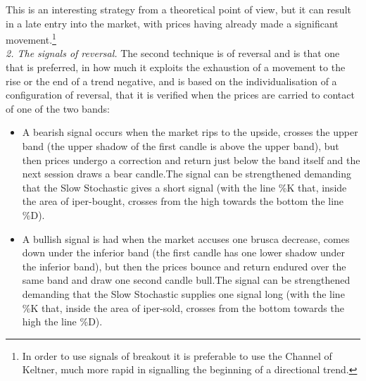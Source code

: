 This is an interesting strategy from a theoretical point of view, but it can result in a late entry into the market, with prices having already made a significant movement.\footnote{In order to use signals of breakout it is preferable to use the Channel of Keltner, much more rapid in signalling the beginning of a directional trend.}  \\

\noindent\textit{2. The signals of reversal.} The second technique is of reversal and is that one that is preferred, in how much it exploits the exhaustion of a movement to the rise or the end of a trend negative, and is based on the individualisation of a configuration of reversal, that it is verified when the prices are carried to contact of one of the two bands: 

\begin{itemize}
\setlength\itemsep{0.3em}
\item A bearish signal occurs when the market rips to the upside, crosses the upper band (the upper shadow of the first candle is above the upper band), but then prices undergo a correction and return just below the band itself and the next session draws a bear candle.The signal can be strengthened demanding that the Slow Stochastic gives a short signal (with the line \%K that, inside the area of iper-bought, crosses from the high towards the bottom the line \%D).
\item A bullish signal is had when the market accuses one brusca decrease, comes down under the inferior band (the first candle has one lower shadow under the inferior band), but then the prices bounce and return endured over the same band and draw one second candle bull.The signal can be strengthened demanding that the Slow Stochastic supplies one signal long (with the line \%K that, inside the area of iper-sold, crosses from the bottom towards the high the line \%D).
\end{itemize} 
